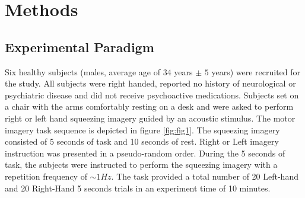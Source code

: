 \documentclass[12pt ]{iopart}
\begin{document}
\section{Methods}
\subsection{Experimental Paradigm}
Six healthy subjects (males, average age of $34$ years $\pm$ $5$ years) were recruited for the study. All subjects were right handed, reported no history of neurological or psychiatric disease and did not receive psychoactive medications. 
Subjects set on a chair with the arms comfortably resting on a desk and were asked to perform right or left hand squeezing imagery guided by an acoustic stimulus. The motor imagery task sequence is depicted in figure \ref{fig:fig1}. The 
squeezing imagery consisted of 5 seconds of task and 10 seconds of rest. Right or Left imagery instruction was presented in a pseudo-random order.  During the 5 seconds of task, the subjects were instructed to perform the squeezing imagery with a repetition frequency of $\sim1Hz$. The task provided a total number of 20 Left-hand and 20 Right-Hand 5 seconds trials in an experiment time of 10 minutes. 
\end{document}
